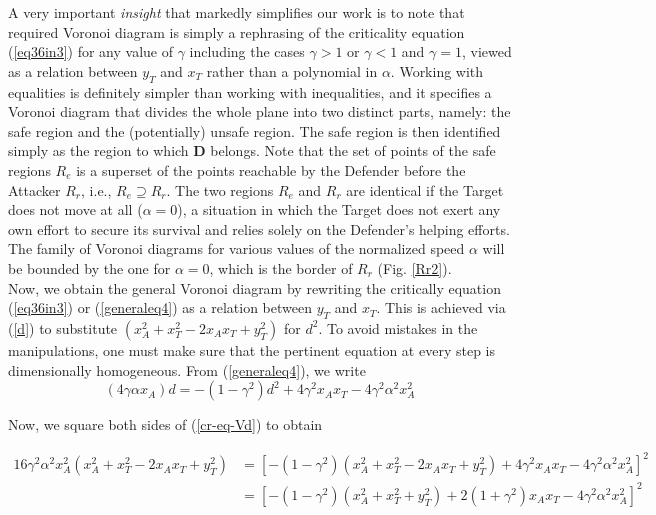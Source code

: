 A very important \textit{insight} that markedly simplifies our work is to note that required Voronoi diagram is simply a rephrasing of the criticality equation (\ref{eq36in3}) for any value of $\gamma$ including the cases $\gamma>1$ or $\gamma<1$ and $\gamma=1$, viewed as a relation between $y_{T}$ and $x_{T}$ rather than a polynomial in $\alpha$. Working with equalities is definitely simpler than working with inequalities, and it specifies a Voronoi diagram that divides the whole plane into two distinct parts, namely: the safe region and the (potentially) unsafe region. The safe region is then identified simply as the region to which $\boldsymbol{D}$ belongs. Note that the set of points of the safe regions $R_{e}$ is a superset of the points reachable by the Defender before the Attacker $R_{r}$, i.e., $R_{e}\supseteq R_{r}$. The two regions $R_{e}$ and $R_{r}$ are identical if the Target does not move at all ($\alpha=0$), a situation in which the Target does not exert any own effort to secure its survival and relies solely on the Defender's helping efforts. The family of Voronoi diagrams for various values of the normalized speed $\alpha$ will be bounded by the one for $\alpha=0$, which is the border of $R_r$ (Fig. \ref{Rr2}).\\
Now, we obtain the general Voronoi diagram by rewriting the critically equation (\ref{eq36in3}) or (\ref{generaleq4}) as a relation between $y_{T}$ and $x_{T}$. This is achieved via (\ref{d}) to substitute $(x_{A}^{2}+x_{T}^{2}-2x_{A}x_{T}+y_{T}^{2})$ for $d^{2}$. To avoid mistakes in the manipulations, one must make sure that the pertinent equation at every step is dimensionally homogeneous. From (\ref{generaleq4}), we write
\begin{equation}
(4\gamma \alpha x_{A})d= -(1-\gamma^{2})d^{2}
+4 \gamma^{2} x_{A} x_{T}
-4 \gamma^{2} \alpha^{2} x_{A}^{2}
\label{cr-eq-Vd}
\end{equation}

Now, we square both sides of (\ref{cr-eq-Vd}) to obtain

\begin{equation}
\begin{split}
16 \gamma^{2} \alpha^{2} x_{A}^{2} (x_{A}^{2} +x_{T}^{2}-2x_{A}x_{T}+y_{T}^{2})
&=[-(1-\gamma^{2})(x_{A}^{2} +x_{T}^{2}-2x_{A}x_{T}+y_{T}^{2})+4 \gamma^{2} x_{A} x_{T}-4 \gamma^{2} \alpha^{2} x_{A}^{2}]^{2}\\
&=[-(1-\gamma^{2})(x_{A}^{2}+x_{T}^{2}+y_{T}^{2})+2(1+\gamma^{2})x_{A}x_{T}-4 \gamma^{2} \alpha^{2} x_{A}^{2}]^{2}
\end{split}
\label{poly1}
\end{equation}

